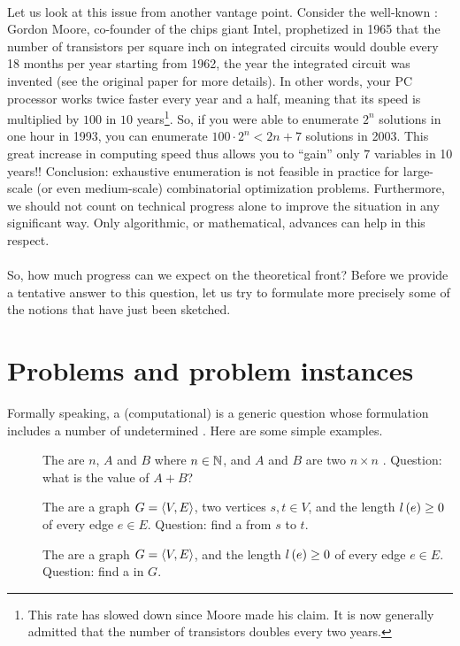 \paragraph{}
Let us look at this issue from another vantage point. Consider the well-known : Gordon Moore, co-founder of the chips giant Intel, prophetized in 1965 that the number of transistors per square inch on integrated circuits would double every 18 months per year starting from 1962, the year the integrated circuit was invented (see the original paper for more details). In other words, your PC processor works twice faster every year and a half, meaning that its speed is multiplied by $100$ in $10$ years\footnote{This rate has slowed down since Moore made his claim. It is now generally admitted that the number of transistors doubles every two years.}. So, if you were able to enumerate $2^n$ solutions in one hour in 1993, you can enumerate $100\cdot2^n<2{n+7}$ solutions in 2003. This great increase in computing speed thus allows you to ``gain'' only $7$ variables in 10 years!! Conclusion: exhaustive enumeration is not feasible in practice for large-scale (or even medium-scale) combinatorial optimization problems. Furthermore, we should not count on technical progress alone to improve the situation in any significant way. Only algorithmic, or mathematical, advances can help in this respect.

\paragraph{}
So, how much progress can we expect on the theoretical front? Before we provide a tentative answer to this question, let us try to formulate more precisely some of the notions that have just been sketched.

\section{Problems and problem instances}
Formally speaking, a (computational)  is a generic question whose formulation includes a number of undetermined . Here are some simple examples.

\begin{description}
 \item[] The  are $n$, $A$ and $B$ where $n\in\mathbb{N}$, and $A$ and $B$ are two $n\times n$ . Question: what is the value of $A+B$?
 \item[] The  are a graph $G=\left\langle V,E \right\rangle$, two vertices $s,t\in V$, and the length $l\left( e \right)\geq 0$ of every edge $e\in E$. Question: find a  from $s$ to $t$.
 \item[] The  are a graph $G=\left\langle V,E \right\rangle$, and the length $l\left( e \right)\geq 0$ of every edge $e\in E$. Question: find a  in $G$.
\end{description}

